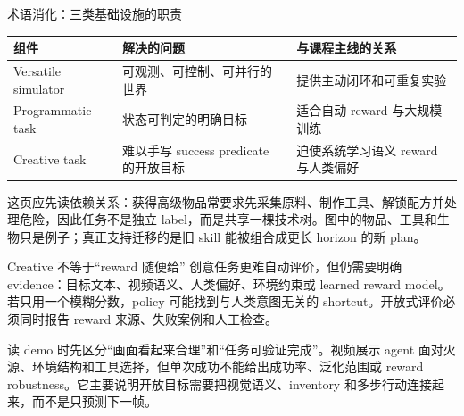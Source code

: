 
\begin{knowledgebox}{术语消化：三类基础设施的职责}
\begin{tabularx}{\textwidth}{@{}L{0.20\textwidth}X X@{}}
\toprule
组件 & 解决的问题 & 与课程主线的关系 \\
\midrule
Versatile simulator & 可观测、可控制、可并行的世界 & 提供主动闭环和可重复实验 \\
Programmatic task & 状态可判定的明确目标 & 适合自动 reward 与大规模训练 \\
Creative task & 难以手写 success predicate 的开放目标 & 迫使系统学习语义 reward 与人类偏好 \\
\bottomrule
\end{tabularx}
\end{knowledgebox}


这页应先读依赖关系：获得高级物品常要求先采集原料、制作工具、解锁配方并处理危险，因此任务不是独立 label，而是共享一棵技术树。图中的物品、工具和生物只是例子；真正支持迁移的是旧 skill 能被组合成更长 horizon 的新 plan。


\begin{warningbox}{Creative 不等于“reward 随便给”}
创意任务更难自动评价，但仍需要明确 evidence：目标文本、视频语义、人类偏好、环境约束或 learned reward model。若只用一个模糊分数，policy 可能找到与人类意图无关的 shortcut。开放式评价必须同时报告 reward 来源、失败案例和人工检查。
\end{warningbox}


读 demo 时先区分“画面看起来合理”和“任务可验证完成”。视频展示 agent 面对火源、环境结构和工具选择，但单次成功不能给出成功率、泛化范围或 reward robustness。它主要说明开放目标需要把视觉语义、inventory 和多步行动连接起来，而不是只预测下一帧。



